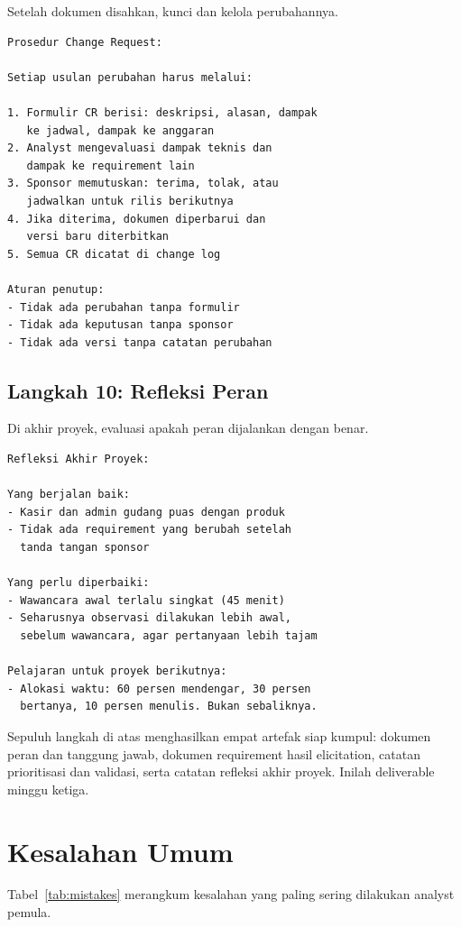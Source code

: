 \documentclass[11pt,a4paper]{article}
\begin{document}
Setelah dokumen disahkan, kunci dan kelola perubahannya.

\begin{lstlisting}[style=out]
Prosedur Change Request:

Setiap usulan perubahan harus melalui:

1. Formulir CR berisi: deskripsi, alasan, dampak
   ke jadwal, dampak ke anggaran
2. Analyst mengevaluasi dampak teknis dan
   dampak ke requirement lain
3. Sponsor memutuskan: terima, tolak, atau
   jadwalkan untuk rilis berikutnya
4. Jika diterima, dokumen diperbarui dan
   versi baru diterbitkan
5. Semua CR dicatat di change log

Aturan penutup:
- Tidak ada perubahan tanpa formulir
- Tidak ada keputusan tanpa sponsor
- Tidak ada versi tanpa catatan perubahan
\end{lstlisting}

\subsection{Langkah 10: Refleksi Peran}

Di akhir proyek, evaluasi apakah peran dijalankan dengan benar.

\begin{lstlisting}[style=out]
Refleksi Akhir Proyek:

Yang berjalan baik:
- Kasir dan admin gudang puas dengan produk
- Tidak ada requirement yang berubah setelah
  tanda tangan sponsor

Yang perlu diperbaiki:
- Wawancara awal terlalu singkat (45 menit)
- Seharusnya observasi dilakukan lebih awal,
  sebelum wawancara, agar pertanyaan lebih tajam

Pelajaran untuk proyek berikutnya:
- Alokasi waktu: 60 persen mendengar, 30 persen
  bertanya, 10 persen menulis. Bukan sebaliknya.
\end{lstlisting}

Sepuluh langkah di atas menghasilkan empat artefak siap kumpul: dokumen peran dan tanggung jawab, dokumen requirement hasil elicitation, catatan prioritisasi dan validasi, serta catatan refleksi akhir proyek. Inilah deliverable minggu ketiga.

\section{Kesalahan Umum}

Tabel~\ref{tab:mistakes} merangkum kesalahan yang paling sering dilakukan analyst pemula.
\end{document}
